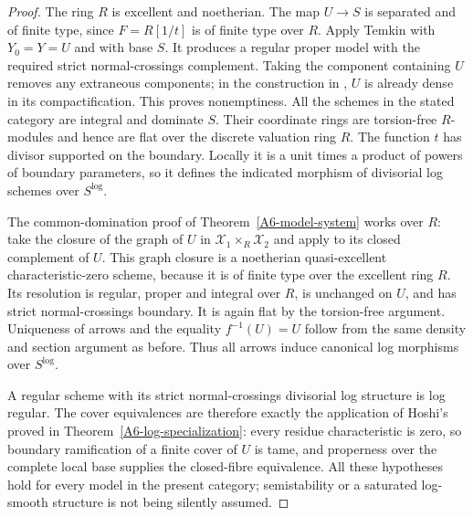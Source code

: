\begin{proof}
The ring $R$ is excellent and noetherian. The map $U\to S$ is separated
and of finite type, since $F=R[1/t]$ is of finite type over $R$.
Apply Temkin \cite[Theorem~1.1.15, p.~5]{Temkin2018A567} with
$Y_0=Y=U$ and with base $S$. It produces a regular proper model with
the required strict normal-crossings complement. Taking the component
containing $U$ removes any extraneous components; in the construction
in \cite[\S3.5.3, p.~24]{Temkin2018A567}, $U$ is already dense in its
compactification. This proves nonemptiness. All the schemes in the
stated category are integral and dominate $S$. Their coordinate rings
are torsion-free $R$-modules and hence are flat over the discrete
valuation ring $R$. The function $t$ has divisor supported on the
boundary. Locally it is a unit times a product of powers of boundary
parameters, so it defines the indicated morphism of divisorial log
schemes over $S^{\log}$.

The common-domination proof of Theorem~\ref{A6-model-system} works over
$R$: take the closure of the graph of $U$ in
$\mathcal X_1\times_R\mathcal X_2$ and apply
\cite[Theorem~1.1.11]{Temkin2018A567} to its closed complement of $U$.
This graph closure is a noetherian quasi-excellent characteristic-zero
scheme, because it is of finite type over the excellent ring $R$.
Its resolution is regular, proper and integral over $R$, is unchanged
on $U$, and has strict normal-crossings boundary. It is again flat by
the torsion-free argument. Uniqueness of arrows and the equality
$f^{-1}(U)=U$ follow from the same density and section argument as
before. Thus all arrows induce canonical log morphisms over $S^{\log}$.

A regular scheme with its strict normal-crossings divisorial log
structure is log regular. The cover equivalences are therefore exactly
the application of Hoshi's
\cite[Proposition~A.10 and Corollary~3.9]{HoshiLog2009A567}
proved in Theorem~\ref{A6-log-specialization}: every residue
characteristic is zero, so boundary ramification of a finite cover of
$U$ is tame, and properness over the complete local base supplies the
closed-fibre equivalence. All these hypotheses hold for every model
in the present category; semistability or a saturated log-smooth
structure is not being silently assumed.


\end{proof}

